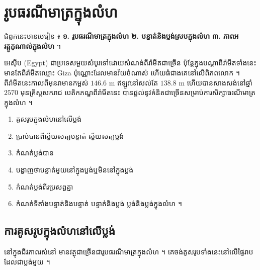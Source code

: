 \chapter{រូបធរណីមាត្រក្នុងលំហ}

\begin{note}[ជំពូកទី ៨ ៖ ធរណីមាត្រក្នុងលំហ]
ជំពូកនេះមានមេរៀន ៖ \textbf{១. រូបធរណីមាត្រក្នុងលំហ} \quad \textbf{២. បន្ទាត់និងប្លង់ស្របក្នុងលំហ} \quad \textbf{៣. ភាពអរត្តូកូណាល់ក្នុងលំហ} ។

អេស៊ីប (Egypt) ជាប្រទេសមួយសំបូរទៅដោយសំណង់ពីរ៉ាមីតជាច្រើន ប៉ុន្តែក្នុងបណ្ដាពីរ៉ាមីតទាំងនេះមានតែពីរ៉ាមីតឈ្មោះ Giza ប៉ុណ្ណោះដែលមានវ័យចំណាស់ ហើយធំជាងគេនៅលើពិភពលោក ។ ពីរ៉ាមីតនេះកាលពីមុនវាមានកម្ពស់ $146.6$ m ឥឡូវនៅសល់តែ $138.8$ m ហើយបានសាងសង់នៅឆ្នាំ $2570$ មុនគ្រិស្តសករាជ បេតិកភណ្ឌពីរ៉ាមីតនេះ បានផ្ដល់នូវគំនិតជាច្រើនសម្រាប់ការសិក្សាធរណីមាត្រក្នុងលំហ ។
\end{note}

\begin{objBox}[វត្ថុបំណង]
\begin{enumerate}[1]
  \item គូសរូបក្នុងលំហនៅលើប្លង់
  \item ប្រាប់បានពីស្វ័យសត្យបន្ទាត់ ស្វ័យសត្យប្លង់
  \item កំណត់ប្លង់បាន
  \item បង្ហាញថាបន្ទាត់មួយនៅក្នុងប្លង់ឬមិននៅក្នុងប្លង់
  \item កំណត់ប្លង់ពីរប្រសព្វគ្នា
  \item កំណត់ទីតាំងបន្ទាត់និងបន្ទាត់ បន្ទាត់និងប្លង់ ប្លង់និងប្លង់ក្នុងលំហ ។
\end{enumerate}
\end{objBox}

\section{ការគូសរូបក្នុងលំហនៅលើប្លង់}
នៅក្នុងជីវភាពរស់នៅ មានវត្ថុជាច្រើនជារូបធរណីមាត្រក្នុងលំហ ។ គេចង់គូសរូបទាំងនេះនៅលើផ្ទៃរាប ដែលជាប្លង់មួយ ។

